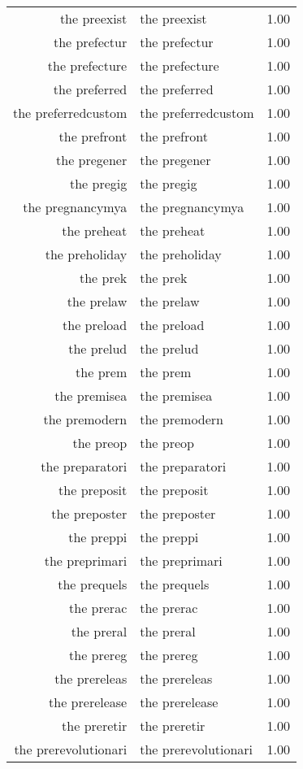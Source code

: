 \begin{table}[ht]
\begin{tabular}{rlr}
  the preexist & the preexist & 1.00 \\ 
  the prefectur & the prefectur & 1.00 \\ 
  the prefecture & the prefecture & 1.00 \\ 
  the preferred & the preferred & 1.00 \\ 
  the preferredcustom & the preferredcustom & 1.00 \\ 
  the prefront & the prefront & 1.00 \\ 
  the pregener & the pregener & 1.00 \\ 
  the pregig & the pregig & 1.00 \\ 
  the pregnancymya & the pregnancymya & 1.00 \\ 
  the preheat & the preheat & 1.00 \\ 
  the preholiday & the preholiday & 1.00 \\ 
  the prek & the prek & 1.00 \\ 
  the prelaw & the prelaw & 1.00 \\ 
  the preload & the preload & 1.00 \\ 
  the prelud & the prelud & 1.00 \\ 
  the prem & the prem & 1.00 \\ 
  the premisea & the premisea & 1.00 \\ 
  the premodern & the premodern & 1.00 \\ 
  the preop & the preop & 1.00 \\ 
  the preparatori & the preparatori & 1.00 \\ 
  the preposit & the preposit & 1.00 \\ 
  the preposter & the preposter & 1.00 \\ 
  the preppi & the preppi & 1.00 \\ 
  the preprimari & the preprimari & 1.00 \\ 
  the prequels & the prequels & 1.00 \\ 
  the prerac & the prerac & 1.00 \\ 
  the preral & the preral & 1.00 \\ 
  the prereg & the prereg & 1.00 \\ 
  the prereleas & the prereleas & 1.00 \\ 
  the prerelease & the prerelease & 1.00 \\ 
  the preretir & the preretir & 1.00 \\ 
  the prerevolutionari & the prerevolutionari & 1.00 \\ 

\end{tabular}
\end{table}
